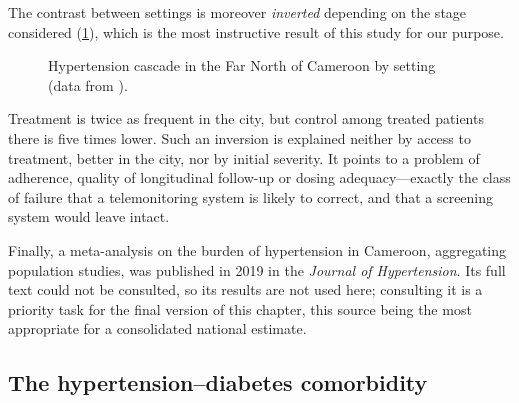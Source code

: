 \documentclass[12pt,a4paper,oneside]{report}
\begin{document}
The contrast between settings is moreover \emph{inverted} depending on the stage considered (\cref{fig:rural-urban}), which is the most instructive result of this study for our purpose.

\begin{figure}[htbp]
\centering
{}
\caption{Hypertension cascade in the Far North of Cameroon by setting (data from \textcite{lemogoum2018}).}\label{fig:rural-urban}
\end{figure}

Treatment is twice as frequent in the city, but control among treated patients there is five times lower. Such an inversion is explained neither by access to treatment, better in the city, nor by initial severity. It points to a problem of adherence, quality of longitudinal follow-up or dosing adequacy---exactly the class of failure that a telemonitoring system is likely to correct, and that a screening system would leave intact.

Finally, a meta-analysis on the burden of hypertension in Cameroon, aggregating population studies, was published in 2019 in the \emph{Journal of Hypertension}. Its full text could not be consulted, so its results are not used here; consulting it is a priority task for the final version of this chapter, this source being the most appropriate for a consolidated national estimate.

\subsection{The hypertension--diabetes comorbidity}\label{sec:comorbidity}
\end{document}
